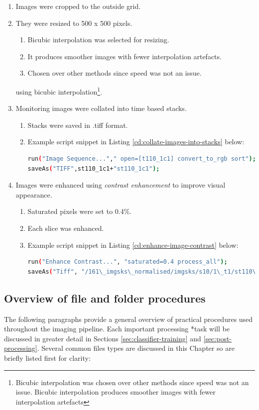\begin{enumerate}
\item Images were cropped to the outside grid.
\item They were resized to 500 x 500 pixels.
\begin{enumerate}
\item Bicubic interpolation was selected for resizing.
\item It produces smoother images with fewer interpolation artefacts.
\item Chosen over other methods since speed was not an issue. 
\end{enumerate}
using bicubic interpolation\footnote{Bicubic interpolation was chosen over other methods since speed was not an issue. Bicubic interpolation produces smoother images with fewer interpolation artefacts}.
\item Monitoring images were collated into time based stacks.
	\begin{enumerate}
	\item Stacks were saved in .tiff format.
	\item Example script snippet in Listing \ref{cd:collate-images-into-stacks} below:
\begin{lstlisting}[language=bash, caption=Collate images into stacks, label=cd:collate-images-into-stacks]
run("Image Sequence..."," open=[t110_1c1] convert_to_rgb sort");
saveAs("TIFF",st110_1c1+"st110_1c1");
\end{lstlisting}
	\end{enumerate}
\item Images were enhanced using \emph{contrast enhancement} to improve visual appearance.
	\begin{enumerate}
	\item Saturated pixels were set to 0.4\%.
	\item Each slice was enhanced.
	\item Example script snippet in Listing \ref{cd:enhance-image-contrast} below:
\begin{lstlisting}[language=bash, caption=Enhance image contrast, label=cd:enhance-image-contrast]
run("Enhance Contrast...", "saturated=0.4 process_all");
saveAs("Tiff", "/161\_imgsks\_normalised/imgsks/s10/1\_t1/st110\_1c1.tif");
\end{lstlisting}
	\end{enumerate}
\end{enumerate}


\subsection{Overview of file and folder procedures }\label{sec:overview-of-procedures-by-folder}
The following paragraphs provide a general overview of practical procedures used throughout the imaging pipeline. Each important processing *task will be discussed in greater detail in Sections \ref{sec:classifier-training} and \ref{sec:post-processing}. Several common files types are discussed in this Chapter so are briefly listed first for clarity:

